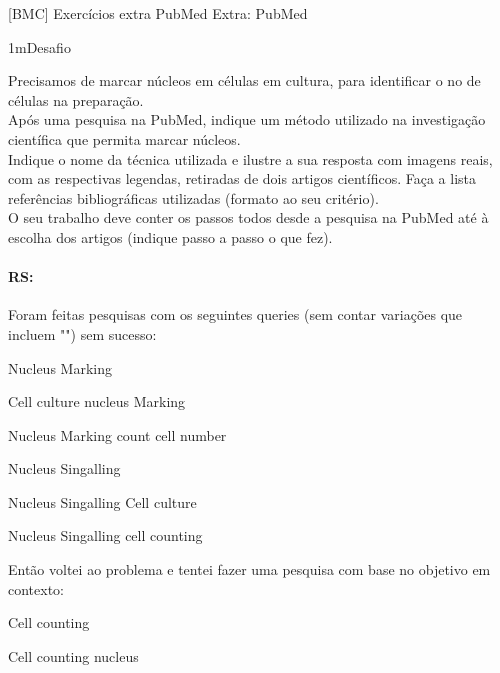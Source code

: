 \documentclass[\mainfilename]{subfiles}
\begin{document}
[BMC]
{Exercícios extra PubMed} %
{Extra: PubMed} %

\begin{questionBox}1m{Desafio} %
    
    Precisamos de marcar núcleos em células em cultura, para identificar o no de células na preparação.\\

    Após uma pesquisa na PubMed, indique um método utilizado na investigação científica que permita marcar núcleos.\\

    Indique o nome da técnica utilizada e ilustre a sua resposta com imagens reais, com as respectivas legendas, retiradas de dois artigos científicos. Faça a lista referências bibliográficas utilizadas (formato ao seu critério).\\

    O seu trabalho deve conter os passos todos desde a pesquisa na PubMed até à escolha dos artigos (indique passo a passo o que fez).\\

    \paragraph*{RS:}

    Foram feitas pesquisas com os seguintes queries (sem contar variações que incluem "") sem sucesso:
    \begin{itemize}
        \begin{multicols}{2}
            \item Nucleus Marking
            \item Cell culture nucleus Marking
            \item Nucleus Marking count cell number
            \item Nucleus Singalling
            \item Nucleus Singalling Cell culture
            \item Nucleus Singalling cell counting
        \end{multicols}
    \end{itemize}

    Então voltei ao problema e tentei fazer uma pesquisa com base no objetivo em contexto:
    \begin{itemize}
        \begin{multicols}{2}
            \item Cell counting
            \item Cell counting nucleus
        \end{multicols}
    \end{itemize}


\end{questionBox}
\end{document}
